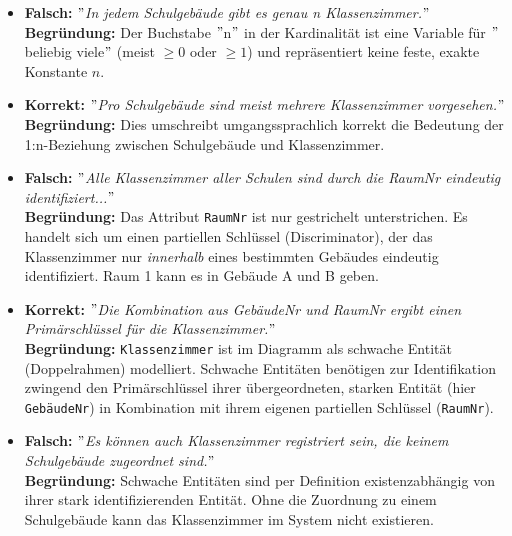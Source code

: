 \documentclass[12pt]{scrartcl}
\begin{document}
    \begin{itemize}
        \item \textbf{Falsch:} \textit{\("\)In jedem Schulgebäude gibt es genau n Klassenzimmer.\("\)} \\
        \textbf{Begründung:} Der Buchstabe \("\)n\("\) in der Kardinalität ist eine Variable für \("\)beliebig viele\("\) (meist $\geq 0$ oder $\geq 1$) und repräsentiert keine feste, exakte Konstante $n$.

        \item \textbf{Korrekt:} \textit{\("\)Pro Schulgebäude sind meist mehrere Klassenzimmer vorgesehen.\("\)} \\
        \textbf{Begründung:} Dies umschreibt umgangssprachlich korrekt die Bedeutung der 1:n-Beziehung zwischen Schulgebäude und Klassenzimmer.

        \item \textbf{Falsch:} \textit{\("\)Alle Klassenzimmer aller Schulen sind durch die RaumNr eindeutig identifiziert...\("\)} \\
        \textbf{Begründung:} Das Attribut \texttt{RaumNr} ist nur gestrichelt unterstrichen. Es handelt sich um einen partiellen Schlüssel (Discriminator), der das Klassenzimmer nur \textit{innerhalb} eines bestimmten Gebäudes eindeutig identifiziert. Raum 1 kann es in Gebäude A und B geben.

        \item \textbf{Korrekt:} \textit{\("\)Die Kombination aus GebäudeNr und RaumNr ergibt einen Primärschlüssel für die Klassenzimmer.\("\)} \\
        \textbf{Begründung:} \texttt{Klassenzimmer} ist im Diagramm als schwache Entität (Doppelrahmen) modelliert. Schwache Entitäten benötigen zur Identifikation zwingend den Primärschlüssel ihrer übergeordneten, starken Entität (hier \texttt{GebäudeNr}) in Kombination mit ihrem eigenen partiellen Schlüssel (\texttt{RaumNr}).

        \item \textbf{Falsch:} \textit{\("\)Es können auch Klassenzimmer registriert sein, die keinem Schulgebäude zugeordnet sind.\("\)} \\
        \textbf{Begründung:} Schwache Entitäten sind per Definition existenzabhängig von ihrer stark identifizierenden Entität. Ohne die Zuordnung zu einem Schulgebäude kann das Klassenzimmer im System nicht existieren.
    \end{itemize}

\end{document}

